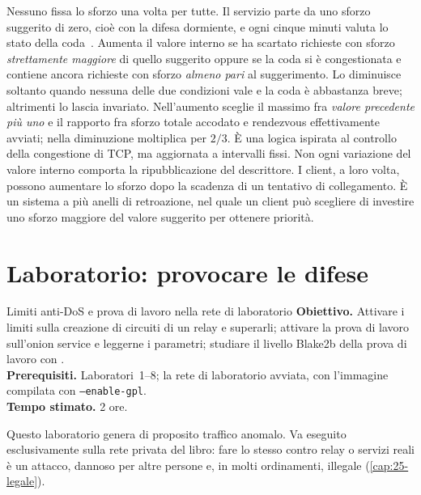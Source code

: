 Nessuno fissa lo sforzo una volta per tutte. Il servizio parte da uno sforzo suggerito di zero, cioè con la difesa dormiente, e ogni cinque minuti valuta lo stato della coda~. Aumenta il valore interno se ha scartato richieste con sforzo \emph{strettamente maggiore} di quello suggerito oppure se la coda si è congestionata e contiene ancora richieste con sforzo \emph{almeno pari} al suggerimento. Lo diminuisce soltanto quando nessuna delle due condizioni vale e la coda è abbastanza breve; altrimenti lo lascia invariato. Nell'aumento sceglie il massimo fra \emph{valore precedente più uno} e il rapporto fra sforzo totale accodato e rendezvous effettivamente avviati; nella diminuzione moltiplica per $2/3$. È una logica ispirata al controllo della congestione di TCP, ma aggiornata a intervalli fissi. Non ogni variazione del valore interno comporta la ripubblicazione del descrittore. I client, a loro volta, possono aumentare lo sforzo dopo la scadenza di un tentativo di collegamento. È un sistema a più anelli di retroazione, nel quale un client può scegliere di investire uno sforzo maggiore del valore suggerito per ottenere priorità.

\section{Laboratorio: provocare le difese}\label{sec:lab-dos}

\begin{laboratorio}[9]{Limiti anti-DoS e prova di lavoro nella rete di laboratorio}
\textbf{Obiettivo.} Attivare i limiti sulla creazione di circuiti di un relay e superarli; attivare la prova di lavoro sull'onion service e leggerne i parametri; studiare il livello Blake2b della prova di lavoro con .\\
\textbf{Prerequisiti.} Laboratori~1--8; la rete di laboratorio avviata, con l'immagine compilata con \texttt{--enable-gpl}.\\
\textbf{Tempo stimato.} 2 ore.
\end{laboratorio}

\begin{attenzione}
Questo laboratorio genera di proposito traffico anomalo. Va eseguito esclusivamente sulla rete privata del libro: fare lo stesso contro relay o servizi reali è un attacco, dannoso per altre persone e, in molti ordinamenti, illegale (\cref{cap:25-legale}).
\end{attenzione}

